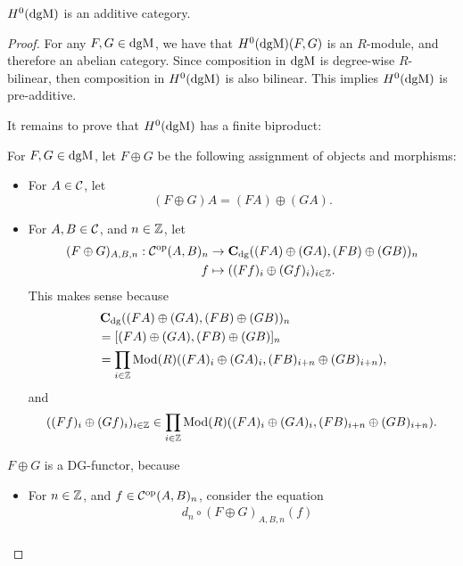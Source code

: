 \begin{lemma}
    \( H^0(\operatorname{dgM}) \) is an additive category.
\end{lemma}
\begin{proof}
    For any \( F, G \in \operatorname{dgM} \), we have that \( H^0(\operatorname{dgM})(F, G) \) is an \( R \)-module, and therefore an abelian category. Since composition in \( \operatorname{dgM} \) is degree-wise \( R \)-bilinear, then composition in \( H^0(\operatorname{dgM}) \) is also bilinear. This implies \( H^0(\operatorname{dgM}) \) is pre-additive.

    It remains to prove that \( H^0(\operatorname{dgM}) \) has a finite biproduct:

    For \( F, G \in \operatorname{dgM} \), let \( F \oplus G \) be the following assignment of objects and morphisms:
    \begin{itemize}
        \item {
            For \( A \in {\mathcal{C}} \), let
            \[
                (F \oplus G) A = (F A) \oplus (G A).
            \]
        }
        \item {
            For \( A, B \in {\mathcal{C}} \), and \( n \in {\mathbb{Z}} \), let
            \begin{align*}
                (F \oplus G)_{A, B, n}: {\mathcal{C}}^{\operatorname{op}}(A, B)_n &\to \operatorname{\mathbf{C}}_{\operatorname{dg}}((F A) \oplus (G A), (F B) \oplus (G B))_n \\
                f &\mapsto ((F f)_i \oplus (G f)_i)_{i \in {\mathbb{Z}}}.
            \end{align*}
            This makes sense because
            \begin{align*}
                &\operatorname{\mathbf{C}}_{\operatorname{dg}}((F A) \oplus (G A), (F B) \oplus (G B))_n \\
                &= [(F A) \oplus (G A), (F B) \oplus (G B)]_n \\
                &= \prod_{i \in {\mathbb{Z}}} \operatorname{Mod}(R)((F A)_i \oplus (G A)_i, (F B)_{i + n} \oplus (G B)_{i + n}),
            \end{align*}
            and
            \[
                ((F f)_i \oplus (G f)_i)_{i \in {\mathbb{Z}}} \in \prod_{i \in {\mathbb{Z}}} \operatorname{Mod}(R)((F A)_i \oplus (G A)_i, (F B)_{i + n} \oplus (G B)_{i + n}).
            \]
        }
    \end{itemize}
    \( F \oplus G \) is a DG-functor, because
    \begin{itemize}
        \item {
            For \( n \in {\mathbb{Z}} \), and \( f \in {\mathcal{C}}^{\operatorname{op}}(A, B)_n \), consider the equation
            \begin{align*}
                &d_n \circ (F \oplus G)_{A, B, n} (f) \\

\end{align*}}
\end{itemize}
\end{proof}
